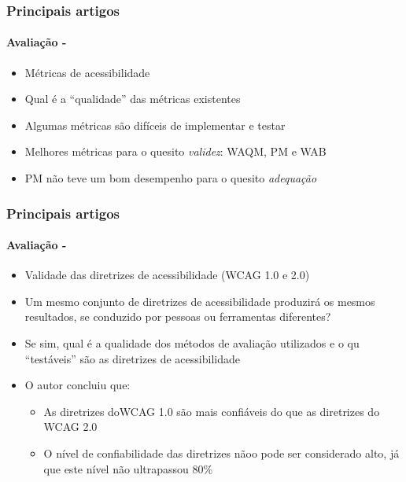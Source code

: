 \documentclass{beamer}
\begin{document}
\begin{frame}
\frametitle{Principais artigos}
\framesubtitle{Avaliação - \citet{Vigo:2011:AWA:1963660.1963798}}

\begin{itemize}
  \item Métricas de acessibilidade
  \item Qual é a ``qualidade'' das métricas existentes
  \item Algumas métricas são difíceis de implementar e testar
  \item Melhores métricas para o quesito \textit{validez}: WAQM, PM e WAB
  \item PM não teve um bom desempenho para o quesito \textit{adequação}
\end{itemize}

\end{frame}

\begin{frame}
\frametitle{Principais artigos}
\framesubtitle{Avaliação - \citet{Brajnik:2009:VRW:1639642.1639666}}

\begin{itemize}
  \item Validade das diretrizes de acessibilidade (WCAG 1.0 e 2.0)
  \item Um mesmo conjunto de diretrizes de acessibilidade produzirá os mesmos resultados, se conduzido por pessoas ou ferramentas diferentes?
  \item Se sim, qual é a qualidade dos métodos de avaliação utilizados e o qu ``testáveis'' são as diretrizes de acessibilidade
  \item O autor concluiu que:
  \begin{itemize}
    \item As diretrizes doWCAG 1.0 são mais confiáveis do que as diretrizes do WCAG 2.0
    \item O nível de confiabilidade das diretrizes nãoo pode ser considerado alto, já que este nível não ultrapassou 80\%
  \end{itemize}
\end{itemize}

\end{frame}
\end{document}
